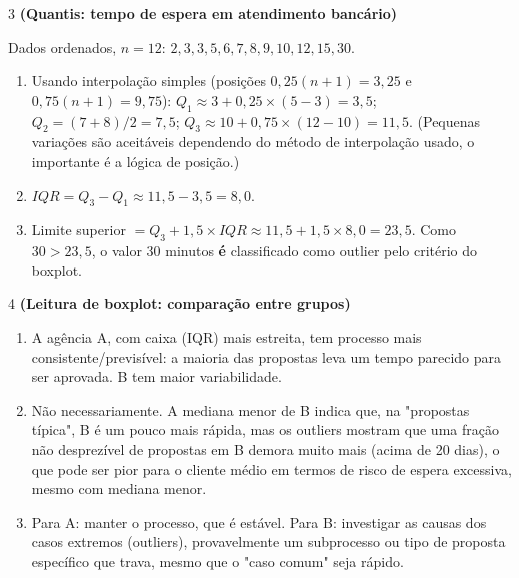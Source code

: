 \documentclass[11pt]{article}
\begin{document}
\begin{questao}{3} \textbf{(Quantis: tempo de espera em atendimento bancário)}
\begin{solucao}
Dados ordenados, $n=12$: $2,3,3,5,6,7,8,9,10,12,15,30$.
\begin{enumerate}[label=(\alph*)]
  \item Usando interpolação simples (posições $0{,}25(n+1)=3{,}25$ e $0{,}75(n+1)=9{,}75$):
    $Q_1 \approx 3 + 0{,}25\times(5-3) = 3{,}5$; $Q_2 = (7+8)/2 = 7{,}5$;
    $Q_3 \approx 10 + 0{,}75\times(12-10) = 11{,}5$. (Pequenas variações são aceitáveis dependendo
    do método de interpolação usado, o importante é a lógica de posição.)
  \item $IQR = Q_3 - Q_1 \approx 11{,}5 - 3{,}5 = 8{,}0$.
  \item Limite superior $= Q_3 + 1{,}5\times IQR \approx 11{,}5 + 1{,}5\times 8{,}0 = 23{,}5$.
    Como $30 > 23{,}5$, o valor 30 minutos \textbf{é} classificado como outlier pelo critério do
    boxplot.
\end{enumerate}
\end{solucao}
\end{questao}

\begin{questao}{4} \textbf{(Leitura de boxplot: comparação entre grupos)}
\begin{solucao}
\begin{enumerate}[label=(\alph*)]
  \item A agência A, com caixa (IQR) mais estreita, tem processo mais consistente/previsível: a
    maioria das propostas leva um tempo parecido para ser aprovada. B tem maior variabilidade.
  \item Não necessariamente. A mediana menor de B indica que, na "propostas típica", B é um pouco
    mais rápida, mas os outliers mostram que uma fração não desprezível de propostas em B demora
    muito mais (acima de 20 dias), o que pode ser pior para o cliente médio em termos de risco de
    espera excessiva, mesmo com mediana menor.
  \item Para A: manter o processo, que é estável. Para B: investigar as causas dos casos extremos
    (outliers), provavelmente um subprocesso ou tipo de proposta específico que trava, mesmo que
    o "caso comum" seja rápido.
\end{enumerate}
\end{solucao}
\end{questao}
\end{document}
